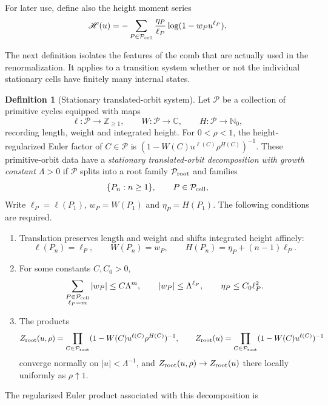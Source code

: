 \documentclass[11pt,reqno]{amsart}
\numberwithin{equation}{section}
\theoremstyle{definition}
\newtheorem{definition}[theorem]{Definition}
\theoremstyle{remark}
\begin{document}
For later use, define also the height moment series
\begin{equation}\label{eq:heightmoment}
 \mathscr H(u)=-\sum_{P\in\mathcal P_{\rm cell}}
 \frac{\eta_P}{\ell_P}\log(1-w_Pu^{\ell_P}).
\end{equation}

The next definition isolates the features of the comb that are actually used
in the renormalization.  It applies to a transition system whether or not the
individual stationary cells have finitely many internal states.

\begin{definition}[Stationary translated-orbit system]
\label{def:translated-orbit-system}
Let $\mathcal P$ be a collection of primitive cycles equipped with maps
\[
 \ell:\mathcal P\to\mathbb Z_{\ge1},\qquad
 W:\mathcal P\to\mathbb C,\qquad
 H:\mathcal P\to\mathbb N_0,
\]
recording length, weight and integrated height.  For $0<\rho<1$, the
height-regularized Euler factor of $C\in\mathcal P$ is
$(1-W(C)u^{\ell(C)}\rho^{H(C)})^{-1}$.  These primitive-orbit data have a
\emph{stationary translated-orbit decomposition with growth constant
$\Lambda>0$} if $\mathcal P$ splits into a root family
$\mathcal P_{\rm root}$ and families
\[
 \{P_n:n\ge1\},\qquad P\in\mathcal P_{\rm cell},
\]
Write $\ell_P=\ell(P_1)$, $w_P=W(P_1)$ and $\eta_P=H(P_1)$.  The following
conditions are required.
\begin{enumerate}[label=(\roman*)]
\item Translation preserves length and weight and shifts integrated height
affinely:
\[
 \ell(P_n)=\ell_P,\qquad W(P_n)=w_P,\qquad
 H(P_n)=\eta_P+(n-1)\ell_P.
\]
\item For some constants $C,C_0>0$,
\begin{equation}\label{eq:abstract-orbit-growth}
 \sum_{\substack{P\in\mathcal P_{\rm cell}\\\ell_P=m}}|w_P|
 \le C\Lambda^m,
 \qquad |w_P|\le\Lambda^{\ell_P},
 \qquad \eta_P\le C_0\ell_P^2.
\end{equation}
\item The products
\[
 Z_{\rm root}(u,\rho)
 =\prod_{C\in\mathcal P_{\rm root}}
   (1-W(C)u^{\ell(C)}\rho^{H(C)})^{-1},
 \qquad
 Z_{\rm root}(u)
 =\prod_{C\in\mathcal P_{\rm root}}
   (1-W(C)u^{\ell(C)})^{-1}
\]
converge normally on $|u|<\Lambda^{-1}$, and
$Z_{\rm root}(u,\rho)\to Z_{\rm root}(u)$ there locally uniformly as
$\rho\uparrow1$.
\end{enumerate}
The regularized Euler product associated with this decomposition is
\begin{equation}\label{eq:abstract-regularized-product}

\end{equation}
\end{definition}
\end{document}
